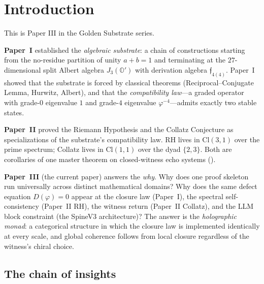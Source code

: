 \documentclass[11pt,a4paper]{article}
\theoremstyle{plain}
\theoremstyle{definition}
\theoremstyle{remark}
\numberwithin{equation}{section}
\providecommand{\Cl}{\mathrm{Cl}}
\providecommand{\Os}{\mathbb{O}'}
\providecommand{\vp}{\varphi}
\providecommand{\fk}[1]{\mathfrak{#1}}
\begin{document}
\tableofcontents

\section{Introduction}
\label{sec:intro}

This is Paper III in the Golden Substrate series.

\textbf{Paper~I} \cite{paper-I-substrate} established the
\emph{algebraic substrate}: a chain of constructions starting
from the no-residue partition of unity $a + b = 1$ and
terminating at the $27$-dimensional split Albert algebra
$J_3(\Os)$ with derivation algebra $\fk{f}_{4(4)}$.  Paper~I
showed that the substrate is forced by classical theorems
(Reciprocal--Conjugate Lemma, Hurwitz, Albert), and that the
\emph{compatibility law}---a graded operator with grade-$0$
eigenvalue $1$ and grade-$4$ eigenvalue $\vp^{-4}$---admits
exactly two stable states.

\textbf{Paper~II} \cite{paper-II-proof} proved the Riemann
Hypothesis and the Collatz Conjecture as specializations of the
substrate's compatibility law.  RH lives in $\Cl(3,1)$ over the
prime spectrum; Collatz lives in $\Cl(1,1)$ over the dyad
$\{2, 3\}$.  Both are corollaries of one master theorem on
closed-witness echo systems (\cite[Thm.~10.2]{paper-II-proof}).

\textbf{Paper~III} (the current paper) answers the
\emph{why}.  Why does one proof skeleton run universally across
distinct mathematical domains?  Why does the same defect equation
$D(\vp) = 0$ appear at the closure law (Paper~I), the spectral
self-consistency (Paper~II RH), the witness return (Paper~II
Collatz), and the LLM block constraint (the SpineV3
architecture)?  The answer is the \emph{holographic monad}: a
categorical structure in which the closure law is implemented
identically at every scale, and global coherence follows from
local closure regardless of the witness's chiral choice.

\subsection*{The chain of insights}
\end{document}
